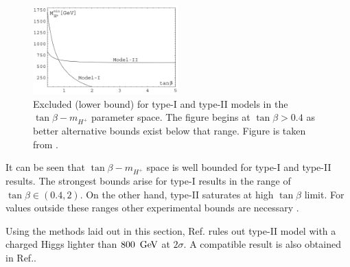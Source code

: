 \begin{figure}[htbp!]
    \centering
        \includegraphics[width=0.5\textwidth]{figures/theory/xsgamma_2hdm_both_types.png}
    \caption{\label{fig:2hdm_limits} 
    Excluded (lower bound) for type-I and type-II \TwoHDM models in the $\tan\beta-m_{H^+}$ parameter space.
    The figure begins at $\tan\beta>0.4$ as better alternative bounds exist below that range.
    Figure is taken from \cite{Misiak:2017bgg}.}
\end{figure}

It can be seen that $\tan\beta-m_{H^+}$ space is well bounded for type-I and type-II \TwoHDM results.
The strongest bounds arise for type-I \TwoHDM results in the range of $\tan\beta\in(0.4,2)$.
On the other hand, type-II \TwoHDM saturates at high $\tan\beta$ limit.
For values outside these ranges other experimental bounds are necessary \cite{Misiak:2017bgg}.

Using the methods laid out in this section, Ref.\cite{Misiak:2020vlo} rules out type-II \TwoHDM model with a charged Higgs lighter than $800~\mathrm{\,Ge\kern -0.1em V}$ at $2\sigma$.
A compatible result is also obtained in Ref.\cite{Atkinson:2021eox}.